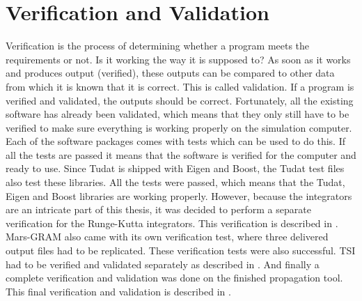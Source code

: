 \chapter{Verification and Validation} 
\label{ch:verificationandvalidation}
Verification is the process of determining whether a program meets the requirements or not. Is it working the way it is supposed to? As soon as it works and produces output (verified), these outputs can be compared to other data from which it is known that it is correct. This is called validation. If a program is verified and validated, the outputs should be correct. Fortunately, all the existing software has already been validated, which means that they only still have to be verified to make sure everything is working properly on the simulation computer. Each of the software packages comes with tests which can be used to do this. If all the tests are passed it means that the software is verified for the computer and ready to use. Since \ac{Tudat} is shipped with Eigen and Boost, the \ac{Tudat} test files also test these libraries. All the tests were passed, which means that the \ac{Tudat}, Eigen and Boost libraries are working properly. However, because the integrators are an intricate part of this thesis, it was decided to perform a separate verification for the Runge-Kutta integrators. This verification is described in . Mars-\ac{GRAM} also came with its own verification test, where three delivered output files had to be replicated. These verification tests were also successful. \ac{TSI} had to be verified and validated separately as described in . And finally a complete verification and validation was done on the finished propagation tool. This final verification and validation is described in .


